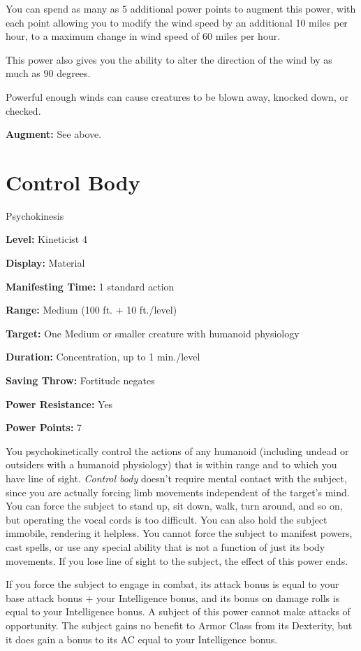 \documentclass{article}
\begin{document}
You can spend as many as 5 additional power points to augment this power, with 
each point allowing you to modify the wind speed by an additional 10 miles per 
hour, to a maximum change in wind speed of 60 miles per hour.

This power also gives you the ability to alter the direction of the wind by as 
much as 90 degrees.

Powerful enough winds can cause creatures to be blown away, knocked down, or checked.

\textbf{Augment:} See above.

\vspace{12pt}
\section*{Control Body}

Psychokinesis

\textbf{Level:} Kineticist 4

\textbf{Display:} Material

\textbf{Manifesting Time:} 1 standard action

\textbf{Range:} Medium (100 ft. + 10 ft./level)

\textbf{Target:} One Medium or smaller creature with humanoid physiology

\textbf{Duration:} Concentration, up to 1 min./level

\textbf{Saving Throw:} Fortitude negates

\textbf{Power Resistance:} Yes

\textbf{Power Points:} 7

You psychokinetically control the actions of any humanoid (including undead or 
outsiders with a humanoid physiology) that is within range and to which you have 
line of sight. \textit{Control body }doesn't require mental contact with the subject, 
since you are actually forcing limb movements independent of the target's mind. 
You can force the subject to stand up, sit down, walk, turn around, and so on, 
but operating the vocal cords is too difficult. You can also hold the subject immobile, 
rendering it helpless. You cannot force the subject to manifest powers, cast spells, 
or use any special ability that is not a function of just its body movements. If 
you lose line of sight to the subject, the effect of this power ends.

If you force the subject to engage in combat, its attack bonus is equal to your 
base attack bonus + your Intelligence bonus, and its bonus on damage rolls is equal 
to your Intelligence bonus. A subject of this power cannot make attacks of opportunity. 
The subject gains no benefit to Armor Class from its Dexterity, but it does gain 
a bonus to its AC equal to your Intelligence bonus.
\end{document}
